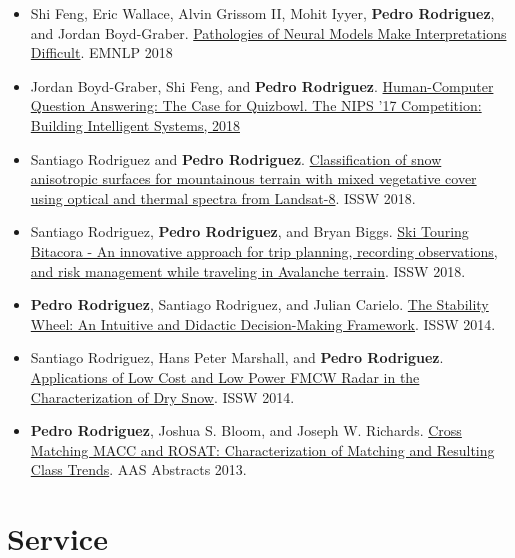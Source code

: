 \documentclass[11pt,a4paper,sans]{moderncv} %
\begin{document}
{\begin{itemize}
    \item Shi Feng, Eric Wallace, Alvin Grissom II, Mohit Iyyer, \textbf{Pedro Rodriguez}, and Jordan Boyd-Graber. \href{https://arxiv.org/abs/1804.07781}{Pathologies of Neural Models Make Interpretations Difficult}. EMNLP 2018
    \item Jordan Boyd-Graber, Shi Feng, and \textbf{Pedro Rodriguez}. \href{https://www.entilzha.io/static/publications/2018_nips_qbcomp.pdf}{Human-Computer Question Answering: The Case for Quizbowl. The NIPS '17 Competition: Building Intelligent Systems, 2018}
	\item Santiago Rodriguez and \textbf{Pedro Rodriguez}. \href{https://arc.lib.montana.edu/snow-science/objects/ISSW2018_P04.4.pdf}{Classification of snow anisotropic surfaces for mountainous terrain with mixed vegetative cover using optical and thermal spectra from Landsat-8}. ISSW 2018.
	\item Santiago Rodriguez, \textbf{Pedro Rodriguez}, and Bryan Biggs. \href{https://arc.lib.montana.edu/snow-science/objects/ISSW2018_P18.4.pdf}{Ski Touring Bitacora - An innovative approach for trip planning, recording observations, and risk management while traveling in Avalanche terrain}. ISSW 2018.
	\item \textbf{Pedro Rodriguez}, Santiago Rodriguez, and Julian Carielo. \href{http://arc.lib.montana.edu/snow-science/objects/ISSW14_paper_P4.34.pdf}{The Stability Wheel: An Intuitive and Didactic Decision-Making Framework}. ISSW 2014.
	\item Santiago Rodriguez, Hans Peter Marshall, and \textbf{Pedro Rodriguez}. \href{http://citeseerx.ist.psu.edu/viewdoc/download?doi=10.1.1.977.7907&rep=rep1&type=pdf}{Applications of Low Cost and Low Power FMCW Radar in the Characterization of Dry Snow}. ISSW 2014.
	\item \textbf{Pedro Rodriguez}, Joshua S. Bloom, and Joseph W. Richards. \href{http://adsabs.harvard.edu/abs/2013AAS...22135428R}{Cross Matching MACC and ROSAT: Characterization of Matching and Resulting Class Trends}. AAS Abstracts 2013.
  \end{itemize}
}{}

\section{Service}
\end{document}
